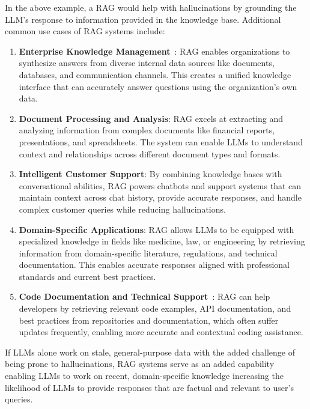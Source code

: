 In the above example, a RAG would help with hallucinations by grounding the LLM's response to information provided in the knowledge base. Additional common use cases of RAG systems include:

\begin{enumerate}
    \item \textbf{Enterprise Knowledge Management}~: RAG enables organizations to synthesize answers from diverse internal data sources like documents, databases, and communication channels. This creates a unified knowledge interface that can accurately answer questions using the organization's own data.
    \item \textbf{Document Processing and Analysis}: RAG excels at extracting and analyzing information from complex documents like financial reports, presentations, and spreadsheets. The system can enable LLMs to understand context and relationships across different document types and formats.
    \item \textbf{Intelligent Customer Support}: By combining knowledge bases with conversational abilities, RAG powers chatbots and support systems that can maintain context across chat history, provide accurate responses, and handle complex customer queries while reducing hallucinations.
    \item \textbf{Domain-Specific Applications}: RAG allows LLMs to be equipped with specialized knowledge in fields like medicine, law, or engineering by retrieving information from domain-specific literature, regulations, and technical documentation. This enables accurate responses aligned with professional standards and current best practices.
    \item \textbf{Code Documentation and Technical Support}~: RAG can help developers by retrieving relevant code examples, API documentation, and best practices from repositories and documentation, which often suffer updates frequently, enabling more accurate and contextual coding assistance.
\end{enumerate}


If LLMs alone work on stale, general-purpose data with the added challenge of being prone to hallucinations, RAG systems serve as an added capability enabling LLMs to work on recent, domain-specific knowledge increasing the likelihood of LLMs to provide responses that are factual and relevant to user's queries.
